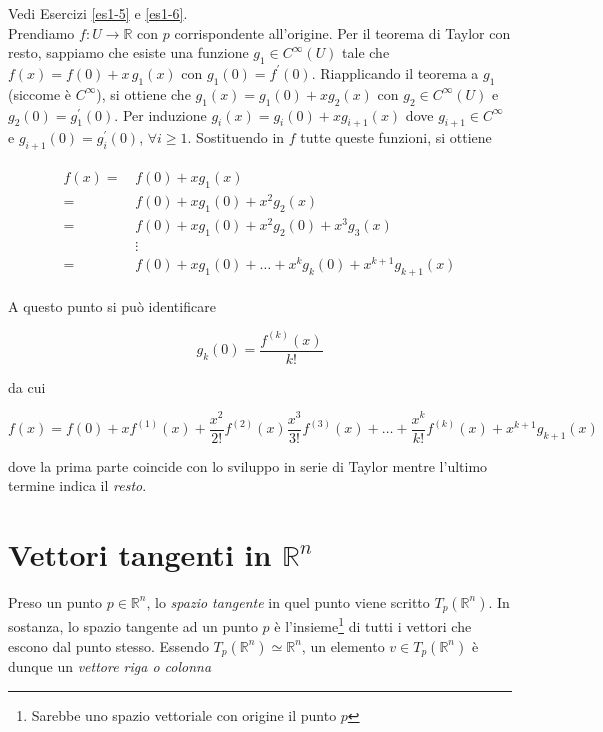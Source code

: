 Vedi Esercizi \ref{es1-5} e \ref{es1-6}.\\
Prendiamo $ f : U \to \mathbb{R} $ con $ p $ corrispondente all'origine. Per il teorema di Taylor con resto, sappiamo che esiste una funzione $ g_{1} \in C^{\infty}(U) $ tale che $ f(x) = f(0) + x \, g_{1}(x) $ con $ g_{1}(0) = f^{\prime}(0) $. Riapplicando il teorema a $ g_{1} $ (siccome è $ C^{\infty} $), si ottiene che $ g_{1}(x) = g_{1}(0) + x g_{2}(x) $ con $ g_{2} \in C^{\infty}(U) $ e $ g_{2}(0) = g_{1}^{\prime}(0) $. Per induzione $ g_{i}(x) = g_{i}(0) + x g_{i+1}(x) $ dove $ g_{i+1} \in C^{\infty} $ e $ g_{i+1}(0) = g_{i}^{\prime}(0) $, $ \forall i \geqslant 1 $. Sostituendo in $ f $ tutte queste funzioni, si ottiene

\begin{align}
	\begin{split}
			f(x) =& \, f(0) + x g_{1}(x)\\
			=& \, f(0) + x g_{1}(0) + x^{2} g_{2}(x)\\
			=& \, f(0) + x g_{1}(0) + x^{2} g_{2}(0) + x^{3} g_{3}(x)\\
			& \, \vdots\\
			=& \, f(0) + x g_{1}(0) + \dots + x^{k} g_{k}(0) + x^{k+1} g_{k+1}(x)
	\end{split}
\end{align}

A questo punto si può identificare

\begin{equation}
	g_{k}(0) = \dfrac{f^{(k)}(x)}{k!}
\end{equation}

da cui

\begin{equation}
	f(x) = f(0) + x f^{(1)}(x) + \dfrac{x^{2}}{2!} f^{(2)}(x) \dfrac{x^{3}}{3!} f^{(3)}(x) + \dots + \dfrac{x^{k}}{k!} f^{(k)}(x) + x^{k+1} g_{k+1}(x)
\end{equation}

dove la prima parte coincide con lo sviluppo in serie di Taylor mentre l'ultimo termine indica il \textit{resto}.

\section{Vettori tangenti in $ \mathbb{R}^{n} $}

Preso un punto $ p \in \mathbb{R}^{n} $, lo \textit{spazio tangente} in quel punto viene scritto $ T_{p}(\mathbb{R}^{n}) $. In sostanza, lo spazio tangente ad un punto $ p $ è l'insieme\footnote{%
	Sarebbe uno spazio vettoriale con origine il punto $ p $%
} di tutti i vettori che escono dal punto stesso. Essendo $ T_{p}(\mathbb{R}^{n}) \simeq \mathbb{R}^{n} $, un elemento $ v \in T_{p}(\mathbb{R}^{n}) $ è dunque un \textit{vettore riga o colonna}

